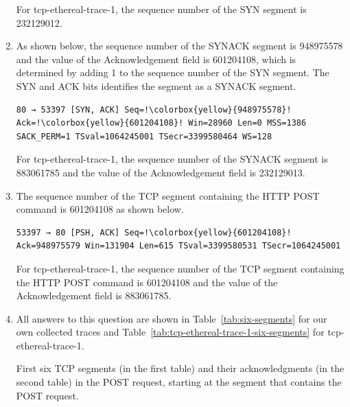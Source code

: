\documentclass{article}
\begin{document}
\begin{enumerate}
    For tcp-ethereal-trace-1, the sequence number of the SYN segment is 232129012.

    \item As shown below, the sequence number of the SYNACK segment is 948975578 and the value of the Acknowledgement field is 601204108, which is determined by adding 1 to the sequence number of the SYN segment. The SYN and ACK bits identifies the segment as a SYNACK segment.
\begin{verbatim}
80 → 53397 [SYN, ACK] Seq=!\colorbox{yellow}{948975578}! Ack=!\colorbox{yellow}{601204108}! Win=28960 Len=0 MSS=1386 SACK_PERM=1 TSval=1064245001 TSecr=3399580464 WS=128
\end{verbatim}

    For tcp-ethereal-trace-1, the sequence number of the SYNACK segment is 883061785 and the value of the Acknowledgement field is 232129013.

    \item The sequence number of the TCP segment containing the HTTP POST command is 601204108 as shown below.
\begin{verbatim}
53397 → 80 [PSH, ACK] Seq=!\colorbox{yellow}{601204108}! Ack=948975579 Win=131904 Len=615 TSval=3399580531 TSecr=1064245001
\end{verbatim}

    For tcp-ethereal-trace-1, the sequence number of the TCP segment containing the HTTP POST command is 601204108 and the value of the Acknowledgement field is 883061785.

    \item All answers to this question are shown in Table~\ref{tab:six-segments} for our own collected traces and Table~\ref{tab:tcp-ethereal-trace-1-six-segments} for tcp-ethereal-trace-1.

    \begin{table}[tb]
        \centering
        \caption{First six TCP segments (in the first table) and their acknowledgments (in the second table) in the POST request, starting at the segment that contains the POST request.}
        \label{tab:six-segments}

        \vspace{2ex}
        

\end{table}
\end{enumerate}
\end{document}
